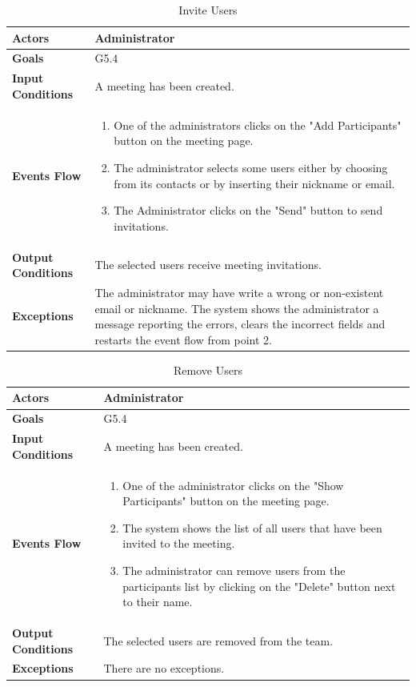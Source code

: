 \begin{table}[H]
	\centering
	\def\arraystretch{1.5}
	\begin{tabular}{|p{7cm}|p{7cm}|}
		\hline
		\textbf{Actors}            & Administrator    \\ \hline
		\textbf{Goals}             & G5.4           \\ \hline
		\textbf{Input Conditions}  & A meeting has been created.           \\ \hline
		\textbf{Events Flow}       &  
		\begin{enumerate}[topsep=0pt, leftmargin=*]
			\item One of the administrators clicks on the "Add Participants" button on the meeting page.
			\item The administrator selects some users either by choosing from its contacts or by inserting their nickname or email.
			\item The Administrator clicks on the "Send" button to send invitations.
		\end{enumerate}           \\ \hline
		\textbf{Output Conditions} & The selected users receive meeting invitations.            \\ \hline
		\textbf{Exceptions}        & 
		The administrator may have write a wrong or non-existent email or nickname. The system shows the administrator a message reporting the errors, clears the incorrect fields and restarts the event flow from point 2.     \\ \hline
	\end{tabular}
	\caption{Invite Users}
\end{table}

\begin{table}[H]
	\centering
	\def\arraystretch{1.5}
	\begin{tabular}{|p{7cm}|p{7cm}|}
		\hline
		\textbf{Actors}            & Administrator    \\ \hline
		\textbf{Goals}             & G5.4           \\ \hline
		\textbf{Input Conditions}  & A meeting has been created.           \\ \hline
		\textbf{Events Flow}       & 
		\begin{enumerate}[topsep=0pt, leftmargin=*]
			\item One of the administrator clicks on the "Show Participants" button on the meeting page.
			\item The system shows the list of all users that have been invited to the meeting.
			\item The administrator can remove users from the participants list by clicking on the "Delete" button next to their name.
		\end{enumerate}            \\ \hline
		\textbf{Output Conditions} & The selected users are removed from the team.            \\ \hline
		\textbf{Exceptions}        & 
		There are no exceptions.         \\ \hline
	\end{tabular}
	\caption{Remove Users}
\end{table}

